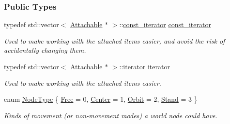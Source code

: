 \subsubsection*{Public Types}
\begin{DoxyCompactItemize}
\item 
\hypertarget{classphys_1_1WorldNode_a76139100e549fd31310cd1bed75338ba}{
typedef std::vector$<$ \hyperlink{classphys_1_1Attachable}{Attachable} $\ast$ $>$::\hyperlink{classphys_1_1WorldNode_a76139100e549fd31310cd1bed75338ba}{const\_\-iterator} \hyperlink{classphys_1_1WorldNode_a76139100e549fd31310cd1bed75338ba}{const\_\-iterator}}
\label{classphys_1_1WorldNode_a76139100e549fd31310cd1bed75338ba}

\begin{DoxyCompactList}\small\item\em Used to make working with the attached items easier, and avoid the risk of accidentally changing them. \item\end{DoxyCompactList}\item 
\hypertarget{classphys_1_1WorldNode_ad7f553f256c4e500e35c36196db26287}{
typedef std::vector$<$ \hyperlink{classphys_1_1Attachable}{Attachable} $\ast$ $>$::\hyperlink{classphys_1_1WorldNode_ad7f553f256c4e500e35c36196db26287}{iterator} \hyperlink{classphys_1_1WorldNode_ad7f553f256c4e500e35c36196db26287}{iterator}}
\label{classphys_1_1WorldNode_ad7f553f256c4e500e35c36196db26287}

\begin{DoxyCompactList}\small\item\em Used to make working with the attached items easier. \item\end{DoxyCompactList}\item 
enum \hyperlink{classphys_1_1WorldNode_a0b178b06aa411b00c4c2ccd926d9bf5a}{NodeType} \{ \hyperlink{classphys_1_1WorldNode_a0b178b06aa411b00c4c2ccd926d9bf5aaa4f848b95586fc581aa1f749c82a1fb5}{Free} =  0, 
\hyperlink{classphys_1_1WorldNode_a0b178b06aa411b00c4c2ccd926d9bf5aa06be3334346d6ba7913197ee0dd5b8bb}{Center} =  1, 
\hyperlink{classphys_1_1WorldNode_a0b178b06aa411b00c4c2ccd926d9bf5aae9751e5fc4396425fbd7b93171541a22}{Orbit} =  2, 
\hyperlink{classphys_1_1WorldNode_a0b178b06aa411b00c4c2ccd926d9bf5aa2ae400375e79106ae01adf39dd5c1185}{Stand} =  3
 \}
\begin{DoxyCompactList}\small\item\em Kinds of movement (or non-\/movement modes) a world node could have. \item\end{DoxyCompactList}\end{DoxyCompactItemize}

